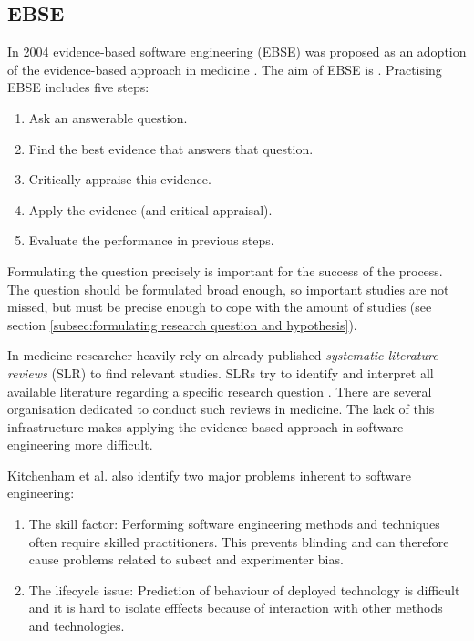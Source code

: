 \subsection{EBSE}
\label{subsec:EBSE}

\newline
In 2004 evidence-based software engineering (EBSE) was proposed as an adoption of the evidence-based approach in medicine \cite{EBSE}. The aim of EBSE is  \cite{Dyba2005}. Practising EBSE includes five steps:
\begin{enumerate}
	\item Ask an answerable question.
	\item Find the best evidence that answers that question.
	\item Critically appraise this evidence.
	\item Apply the evidence (and critical appraisal).
	\item Evaluate the performance in previous steps.
\end{enumerate}
Formulating the question precisely is important for the success of the process. The question should be formulated broad enough, so important studies are not missed, but must be precise enough to cope with the amount of studies (see section \ref{subsec:formulating research question and hypothesis}).

In medicine researcher heavily rely on already published \emph{systematic literature reviews} (SLR) to find relevant studies. SLRs try to identify and interpret all available literature regarding a specific research question \cite{keele2007}. There are several organisation dedicated to conduct such reviews in medicine. The lack of this infrastructure makes applying the evidence-based approach in software engineering more difficult.

Kitchenham et al. \cite{EBSE} also identify two major problems inherent to software engineering:
\begin{enumerate}
\item The skill factor: Performing software engineering methods and techniques often require skilled practitioners. This prevents blinding and can therefore cause problems related to subect and experimenter bias.
\item The lifecycle issue: Prediction of behaviour  of deployed technology is difficult and it is hard to isolate efffects because of interaction with other methods and technologies.
\end{enumerate}

